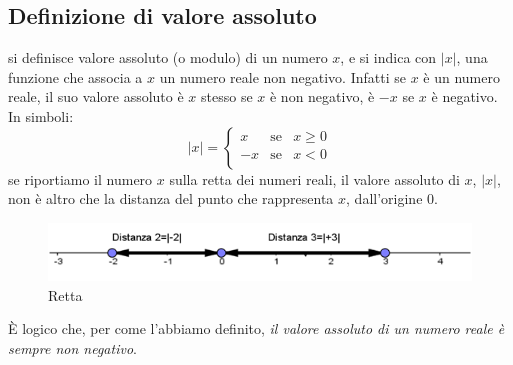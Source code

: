 \subsection{Definizione di valore assoluto}
si definisce valore assoluto (o modulo) di un numero $x$, e si indica con 
$|x|$, 
una funzione che associa a $x$ un numero reale non negativo. Infatti se $x$ è 
un 
numero reale, il suo valore assoluto è $x$ stesso se $x$ è non negativo, è $-x$ 
se $x$ è negativo.\\
In simboli:
$$|x|=\left\lbrace 
\begin{array}{lcl}
x & \text{se} & x\geq 0 \\
-x & \text{se} & x< 0 \\
\end{array}
\right. 
$$
se riportiamo il numero $x$ sulla retta dei numeri reali, il valore assoluto di 
$x$, $|x|$, non è altro che la distanza del punto che rappresenta $x$, 
dall'origine 0.

\begin{figure}[h]
\begin{inaccessibleblock}[TODO]
\centering
\includegraphics[width=0.9\linewidth]{img/imm1} %
\end{inaccessibleblock}
\caption{Retta}
\label{fig:abs_imm1}
\end{figure}

È logico che, per come l'abbiamo definito,\textit{ il valore assoluto di un 
numero reale è sempre non negativo}.

